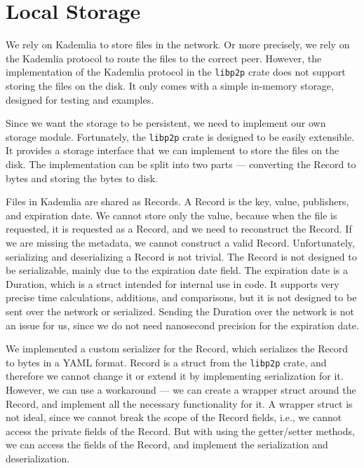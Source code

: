 \section{Local Storage}

We rely on Kademlia to store files in the network.
Or more precisely, we rely on the Kademlia protocol to route the files to the correct peer.
However, the implementation of the Kademlia protocol in
the \texttt{libp2p} crate does not support storing the files on the disk.
It only comes with a simple in-memory storage, designed for testing and examples.

Since we want the storage to be persistent, we need to implement our own storage module.
Fortunately, the \texttt{libp2p} crate is designed to be easily extensible.
It provides a storage interface that we can implement to store the files on the disk.
The implementation can be split into two parts --- converting the Record to bytes
and storing the bytes to disk.

Files in Kademlia are shared as Records.
A Record is the key, value, publishers, and expiration date.
We cannot store only the value, because when the file is requested,
it is requested as a Record, and we need to reconstruct the Record.
If we are missing the metadata, we cannot construct a valid Record.
Unfortunately, serializing and deserializing a Record is not trivial.
The Record is not designed to be serializable, mainly due to the expiration date field.
The expiration date is a Duration, which is a struct intended for internal use in code.
It supports very precise time calculations, additions, and comparisons,
but it is not designed to be sent over the network or serialized.
Sending the Duration over the network is not an issue for us,
since we do not need nanosecond precision for the expiration date.

We implemented a custom serializer for the Record,
which serializes the Record to bytes in a YAML format.
Record is a struct from the \texttt{libp2p} crate,
and therefore we cannot change it or extend it by implementing serialization for it.
However, we can use a workaround --- we can create a wrapper struct around the Record,
and implement all the necessary functionality for it.
A wrapper struct is not ideal, since we cannot break the scope of the Record fields,
i.e., we cannot access the private fields of the Record.
But with using the getter/setter methods, we can access the fields of the Record,
and implement the serialization and deserialization.

